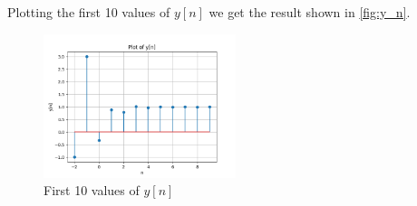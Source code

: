 \documentclass{article}
\begin{document}
Plotting the first 10 values of $y[n]$ we get the result shown in \autoref{fig:y_n}.
\begin{figure}[ht!]
    \centering
    \includegraphics[width=0.5\textwidth]{p3.png}
    \caption{First 10 values of $y[n]$}
    \label{fig:y_n}
\end{figure}

\newpage
\appendix
\end{document}
